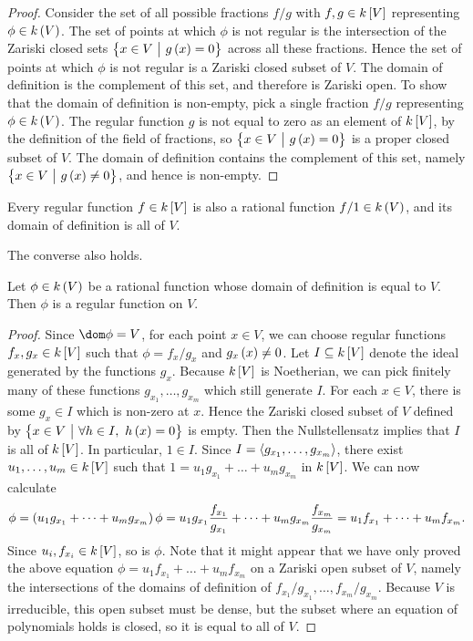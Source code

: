 \begin{proof}
Consider the set of all possible fractions $ f / g $ with $ f, g \in k\sbr{V} $ representing $ \phi \in k\br{V} $. The set of points at which $ \phi $ is not regular is the intersection of the Zariski closed sets $ \cbr{x \in V \st g\br{x} = 0} $ across all these fractions. Hence the set of points at which $ \phi $ is not regular is a Zariski closed subset of $ V $. The domain of definition is the complement of this set, and therefore is Zariski open. To show that the domain of definition is non-empty, pick a single fraction $ f / g $ representing $ \phi \in k\br{V} $. The regular function $ g $ is not equal to zero as an element of $ k\sbr{V} $, by the definition of the field of fractions, so $ \cbr{x \in V \st g\br{x} = 0} $ is a proper closed subset of $ V $. The domain of definition contains the complement of this set, namely $ \cbr{x \in V \st g\br{x} \ne 0} $, and hence is non-empty.
\end{proof}

\begin{note*}
Every regular function $ f \in k\sbr{V} $ is also a rational function $ f / 1 \in k\br{V} $, and its domain of definition is all of $ V $.
\end{note*}

\pagebreak

The converse also holds.

\begin{lemma}
Let $ \phi \in k\br{V} $ be a rational function whose domain of definition is equal to $ V $. Then $ \phi $ is a regular function on $ V $.
\end{lemma}

\begin{proof}
Since $ \dom \phi = V $, for each point $ x \in V $, we can choose regular functions $ f_x, g_x \in k\sbr{V} $ such that $ \phi = f_x / g_x $ and $ g_x\br{x} \ne 0 $. Let $ I \subseteq k\sbr{V} $ denote the ideal generated by the functions $ g_x $. Because $ k\sbr{V} $ is Noetherian, we can pick finitely many of these functions $ g_{x_1}, \dots, g_{x_m} $ which still generate $ I $. For each $ x \in V $, there is some $ g_x \in I $ which is non-zero at $ x $. Hence the Zariski closed subset of $ V $ defined by $ \cbr{x \in V \st \forall h \in I, \ h\br{x} = 0} $ is empty. Then the Nullstellensatz implies that $ I $ is all of $ k\sbr{V} $. In particular, $ 1 \in I $. Since $ I = \left\langle g_{x_1}, \dots, g_{x_m} \right\rangle $, there exist $ u_1, \dots, u_m \in k\sbr{V} $ such that $ 1 = u_1g_{x_1} + \dots + u_mg_{x_m} $ in $ k\sbr{V} $. We can now calculate
$$ \phi = \br{u_1g_{x_1} + \dots + u_mg_{x_m}}\phi = u_1g_{x_1}\dfrac{f_{x_1}}{g_{x_1}} + \dots + u_mg_{x_m}\dfrac{f_{x_m}}{g_{x_m}} = u_1f_{x_1} + \dots + u_mf_{x_m}. $$
Since $ u_i, f_{x_i} \in k\sbr{V} $, so is $ \phi $. Note that it might appear that we have only proved the above equation $ \phi = u_1f_{x_1} + \dots + u_mf_{x_m} $ on a Zariski open subset of $ V $, namely the intersections of the domains of definition of $ f_{x_1} / g_{x_1}, \dots, f_{x_m} / g_{x_m} $. Because $ V $ is irreducible, this open subset must be dense, but the subset where an equation of polynomials holds is closed, so it is equal to all of $ V $.
\end{proof}

